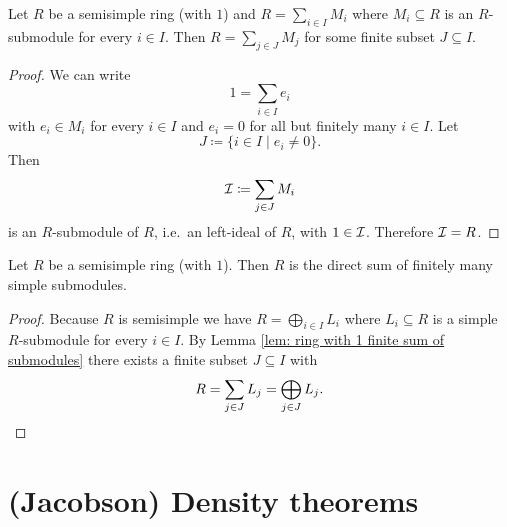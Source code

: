 \begin{lem}\label{lem: ring with 1 finite sum of submodules}
  Let $R$ be a semisimple ring (with $1$) and $R = \sum_{i \in I} M_i$ where $M_i \subseteq R$ is an $R$-submodule for every $i \in I$. Then $R = \sum_{j \in J} M_j$ for some finite subset $J \subseteq I$.
\end{lem}
\begin{proof}
  We can write
  \[
    1 = \sum_{i \in I} e_i
  \]
  with $e_i \in M_i$ for every $i \in I$ and $e_i = 0$ for all but finitely many $i \in I$. Let
  \[
    J \coloneqq \{i \in I \mid e_i \neq 0\}.
  \]
  Then
  \[
    \mathcal{I} \coloneqq \sum_{j \in J} M_i
  \]
  is an $R$-submodule of $R$, i.e.\ an left-ideal of $R$, with $1 \in \mathcal{I}$. Therefore $\mathcal{I} = R$.
\end{proof}


\begin{cor}\label{lem: semisimple ring with 1 only finitely many summands}
  Let $R$ be a semisimple ring (with $1$). Then $R$ is the direct sum of finitely many simple submodules.
\end{cor}
\begin{proof}
  Because $R$ is semisimple we have $R = \bigoplus_{i \in I} L_i$ where $L_i \subseteq R$ is a simple $R$-submodule for every $i \in I$. By Lemma \ref{lem: ring with 1 finite sum of submodules} there exists a finite subset $J \subseteq I$ with
  \[
    R = \sum_{j \in J} L_j = \bigoplus_{j \in J} L_j.
    \qedhere
  \]
\end{proof}





\section{(Jacobson) Density theorems}


